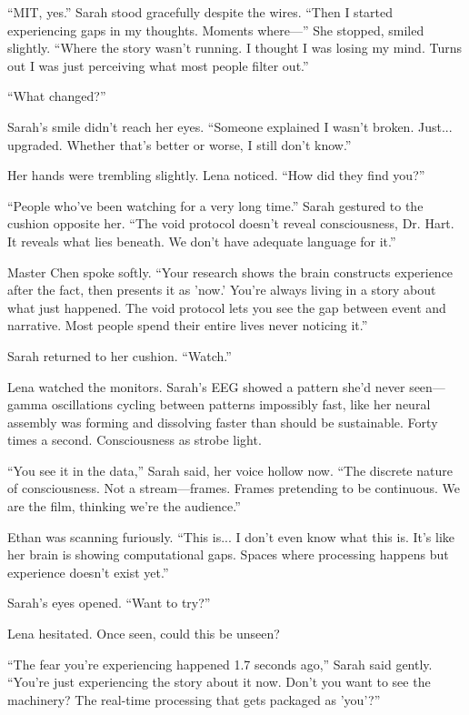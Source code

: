 ``MIT, yes.'' Sarah stood gracefully despite the wires. ``Then I started experiencing gaps in my thoughts. Moments where—'' She stopped, smiled slightly. ``Where the story wasn't running. I thought I was losing my mind. Turns out I was just perceiving what most people filter out.''

``What changed?''

Sarah's smile didn't reach her eyes. ``Someone explained I wasn't broken. Just... upgraded. Whether that's better or worse, I still don't know.''

Her hands were trembling slightly. Lena noticed. ``How did they find you?''

``People who've been watching for a very long time.'' Sarah gestured to the cushion opposite her. ``The void protocol doesn't reveal consciousness, Dr. Hart. It reveals what lies beneath. We don't have adequate language for it.''

Master Chen spoke softly. ``Your research shows the brain constructs experience after the fact, then presents it as 'now.' You're always living in a story about what just happened. The void protocol lets you see the gap between event and narrative. Most people spend their entire lives never noticing it.''

Sarah returned to her cushion. ``Watch.''

Lena watched the monitors. Sarah's EEG showed a pattern she'd never seen—gamma oscillations cycling between patterns impossibly fast, like her neural assembly was forming and dissolving faster than should be sustainable. Forty times a second. Consciousness as strobe light.

``You see it in the data,'' Sarah said, her voice hollow now. ``The discrete nature of consciousness. Not a stream—frames. Frames pretending to be continuous. We are the film, thinking we're the audience.''

Ethan was scanning furiously. ``This is... I don't even know what this is. It's like her brain is showing computational gaps. Spaces where processing happens but experience doesn't exist yet.''

Sarah's eyes opened. ``Want to try?''

Lena hesitated. Once seen, could this be unseen?

``The fear you're experiencing happened 1.7 seconds ago,'' Sarah said gently. ``You're just experiencing the story about it now. Don't you want to see the machinery? The real-time processing that gets packaged as 'you'?''

